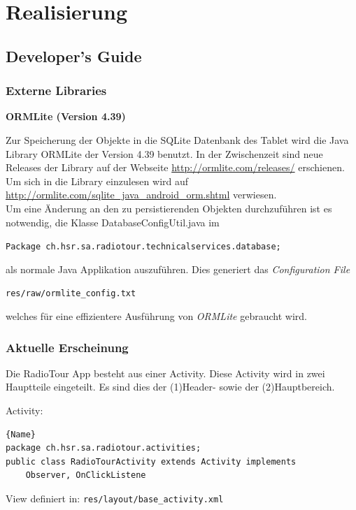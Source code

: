 \chapter{Realisierung}
\section{Developer's Guide}
\label{ref:devguide}
\subsection{Externe Libraries}
\textbf{ORMLite (Version 4.39)}

Zur Speicherung der Objekte in die SQLite Datenbank des Tablet wird die Java Library ORMLite der Version 4.39 benutzt. In der Zwischenzeit sind neue Releases der Library auf der Webseite \url{http://ormlite.com/releases/} erschienen. Um sich in die Library einzulesen wird auf \url{http://ormlite.com/sqlite_java_android_orm.shtml} verwiesen.
\\
Um eine Änderung an den zu persistierenden Objekten durchzuführen ist es notwendig, die Klasse DatabaseConfigUtil.java im

\lstinline|Package ch.hsr.sa.radiotour.technicalservices.database;|

als normale Java Applikation auszuführen. Dies generiert das \textit{Configuration File}

\lstinline|res/raw/ormlite_config.txt|

welches für eine effizientere Ausführung von \textit{ORMLite} gebraucht wird.

\subsection{Aktuelle Erscheinung}
Die RadioTour App besteht aus einer Activity. Diese Activity wird in zwei Hauptteile eingeteilt. Es sind dies der (1)Header- sowie der (2)Hauptbereich. 

Activity:
\begin{lstlisting}{Name}
package ch.hsr.sa.radiotour.activities;
public class RadioTourActivity extends Activity implements
	Observer, OnClickListene
\end{lstlisting}


View definiert in:
\lstinline|res/layout/base_activity.xml|

